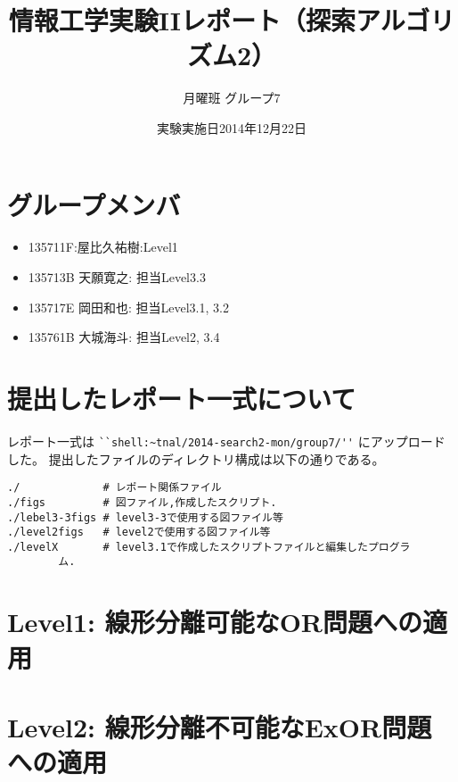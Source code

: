 \documentclass[10pt]{jarticle}
\begin{document}
\title{情報工学実験IIレポート（探索アルゴリズム2）}
\author{ 月曜班  グループ7} %
\date{実験実施日2014年12月22日}

\maketitle


\section*{グループメンバ}
\begin{itemize}
 \item 135711F:屋比久祐樹:Level1
 \item 135713B 天願寛之: 担当Level3.3
 \item 135717E 岡田和也: 担当Level3.1, 3.2
 \item 135761B 大城海斗: 担当Level2, 3.4
\end{itemize}

\section*{提出したレポート一式について}
レポート一式は
\verb|``shell:~tnal/2014-search2-mon/group7/''|
にアップロードした。
提出したファイルのディレクトリ構成は以下の通りである。

\begin{breakbox}
\begin{verbatim}
./             # レポート関係ファイル
./figs         # 図ファイル,作成したスクリプト.
./lebel3-3figs # level3-3で使用する図ファイル等
./level2figs   # level2で使用する図ファイル等
./levelX       # level3.1で作成したスクリプトファイルと編集したプログラ
		ム.
\end{verbatim}
\end{breakbox}

\newpage

\section{Level1: 線形分離可能なOR問題への適用}


\newpage

\section{Level2: 線形分離不可能なExOR問題への適用}

\end{document}
